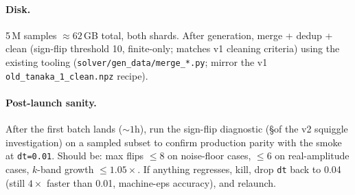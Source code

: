 \documentclass[11pt]{article}
\begin{document}
\paragraph{Disk.} 5\,M samples $\approx 62$\,GB total, both shards.
After generation, merge + dedup + clean (sign-flip threshold 10, finite-only;
matches v1 cleaning criteria) using the existing tooling
(\texttt{solver/gen\_data/merge\_*.py}; mirror the v1 \texttt{old\_tanaka\_1\_clean.npz}
recipe).

\paragraph{Post-launch sanity.} After the first batch lands ($\sim\!1$h), run the
sign-flip diagnostic (\S of the v2 squiggle investigation) on a sampled subset to
confirm production parity with the smoke at \texttt{dt=0.01}. Should be: max flips $\le 8$
on noise-floor cases, $\le 6$ on real-amplitude cases, $k$-band growth $\le 1.05\times$.
If anything regresses, kill, drop \texttt{dt} back to 0.04 (still $4\times$ faster than
0.01, machine-eps accuracy), and relaunch.
\end{document}
